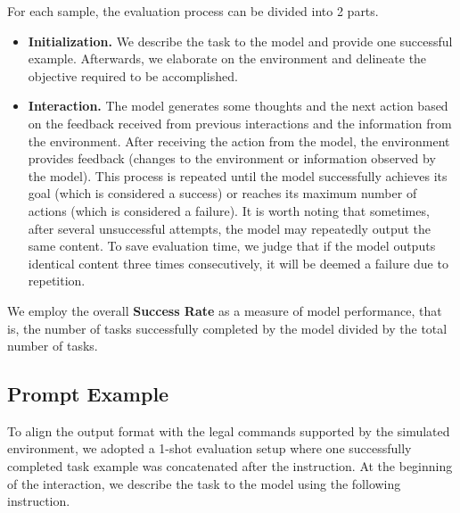For each sample, the evaluation process can be divided into 2 parts. 

\begin{itemize}[leftmargin=1.5em,itemsep=0pt,parsep=0.2em,topsep=0.0em,partopsep=0.0em]
    \item \textbf{Initialization.} We describe the task to the model and provide one successful example. Afterwards, we elaborate on the environment and delineate the objective required to be accomplished.
    \item \textbf{Interaction.} The model generates some thoughts and the next action based on the feedback received from previous interactions and the information from the environment. After receiving the action from the model, the environment provides feedback (changes to the environment or information observed by the model). This process is repeated until the model successfully achieves its goal (which is considered a success) or reaches its maximum number of actions (which is considered a failure). It is worth noting that sometimes, after several unsuccessful attempts, the model may repeatedly output the same content. To save evaluation time, we judge that if the model outputs identical content three times consecutively, it will be deemed a failure due to repetition.
\end{itemize}


We employ the overall \textbf{Success Rate} as a measure of model performance, that is, the number of tasks successfully completed by the model divided by the total number of tasks.

\subsection{Prompt Example}
To align the output format with the legal commands supported by the simulated environment, we adopted a 1-shot evaluation setup where one successfully completed task example was concatenated after the instruction. 
At the beginning of the interaction, we describe the task to the model using the following instruction.

